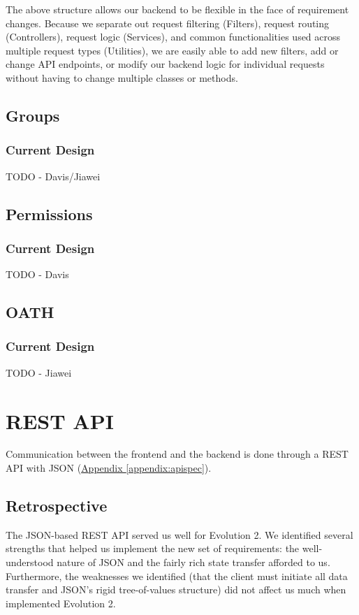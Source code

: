 \documentclass[12pt]{article}
\begin{document}
The above structure allows our backend to be flexible in the face of requirement changes. Because we separate out request filtering (Filters), request routing (Controllers), request logic (Services), and common functionalities used across multiple request types (Utilities), we are easily able to add new filters, add or change API endpoints, or modify our backend logic for individual requests without having to change multiple classes or methods. 

\subsection{Groups}
\label{sec:GROUPS}
\subsubsection{Current Design}
TODO - Davis/Jiawei

\subsection{Permissions}
\subsubsection{Current Design}
TODO - Davis

\subsection{OATH}
\subsubsection{Current Design}
TODO - Jiawei


\section{REST API}
\label{sec:REST}
Communication between the frontend and the backend is done through a REST API with JSON (\hyperref[appendix:apispec]{Appendix \ref{appendix:apispec}}).

\subsection{Retrospective}
The JSON-based REST API served us well for Evolution 2. We identified several strengths that helped us implement the new set of requirements: the well-understood nature of JSON and the fairly rich state transfer afforded to us. Furthermore, the weaknesses we identified (that the client must initiate all data transfer and JSON's rigid tree-of-values structure) did not affect us much when implemented Evolution 2.
\end{document}
